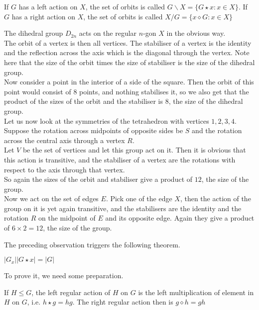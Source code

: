 \begin{definition}
    If $G$ has a left action on $X$, the set of orbits is called $G\backslash X=\{G\star x:x\in X\}$.
    If $G$ has a right action on $X$, the set of orbits is called $X/G=\{x\diamond G:x\in X\}$
\end{definition}
\begin{example}
    The dihedral group $D_{2n}$ acts on the regular $n$-gon $X$ in the obvious way.\\
    The orbit of a vertex is then all vertices.
    The stabiliser of a vertex is the identity and the reflection across the axis which is the diagonal through the vertex.
    Note here that the size of the orbit times the size of stabiliser is the size of the dihedral group.\\
    Now consider a point in the interior of a side of the square.
    Then the orbit of this point would consist of $8$ points, and nothing stabilises it, so we also get that the product of the sizes of the orbit and the stabiliser is $8$, the size of the dihedral group.\\
    Let us now look at the symmetries of the tetrahedron with vertices $1,2,3,4$.
    Suppose the rotation across midpoints of opposite sides be $S$ and the rotation across the central axis through a vertex $R$.\\
    Let $V$ be the set of vertices and let this group act on it.
    Then it is obvious that this action is transitive, and the stabiliser of a vertex are the rotations with respect to the axis through that vertex.\\
    So again the sizes of the orbit and stabiliser give a product of $12$, the size of the group.\\
    Now we act on the set of edges $E$.
    Pick one of the edge $X$, then the action of the group on it is yet again transitive, and the stabilisers are the identity and the rotation $R$ on the midpoint of $E$ and its opposite edge.
    Again they give a product of $6\times 2=12$, the size of the group.
\end{example}
The preceding observation triggers the following theorem.
\begin{theorem}\label{ost_finite}
    $|G_x||G\star x|=|G|$
\end{theorem}
To prove it, we need some preparation.
\begin{proposition}
    If $H\le G$, the left regular action of $H$ on $G$ is the left multiplication of element in $H$ on $G$, i.e. $h\star g=hg$.
    The right regular action then is $g\diamond h=gh$
\end{proposition}
